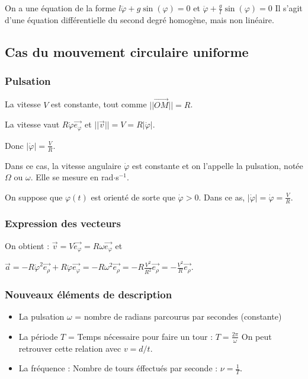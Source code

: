 \documentclass[french]{yLectureNote}
\renewcommand{\vec}{\overrightarrow}
\newcommand{\norm}[1]{||\vec{#1}||}
\begin{document}
On a une équation de la forme $l\ddot{\varphi} + g\sin(\varphi) = 0$ et $\ddot{\varphi} + \frac{g}{l}\sin(\varphi) = 0$ Il s'agit d'une équation différentielle du second degré homogène, mais non linéaire.

\subsection{Cas du mouvement circulaire uniforme}
\subsubsection{Pulsation}
La vitesse $V$ est constante, tout comme $\norm{OM} = R$.

 La vitesse vaut $R\dot{\varphi}\vec{e_{\varphi}}$ et $\norm{v} = V = R|\dot{\varphi}|$.

 Donc $|\dot{\varphi}| = \frac{V}{R}$.

Dans ce cas, la vitesse angulaire $\dot{\varphi}$ est constante et on l'appelle la pulsation, notée $\Omega$ ou $\omega$. Elle se mesure en rad$\cdot$s$^{-1}$.

On suppose que $\varphi(t)$ est orienté de sorte que $\dot{\varphi} >0$. Dans ce as, $|\dot{\varphi}| = \dot{\varphi} = \frac{V}{R}$.
\subsubsection{Expression des vecteurs}

On obtient :
$\vec{v} = V\vec{e_{\varphi}} = R\omega \vec{e_{\varphi}}$ et

$\vec{a} = -R\dot{\varphi}^2\vec{e_{\rho}} + R\ddot{\varphi}\vec{e_{\varphi}} = -R\omega^2\vec{e_{\rho}} = -R\frac{V^2}{R^2}\vec{e_{\rho}} = -\frac{V^2}{R}\vec{e_{\rho}}$.


\subsubsection{Nouveaux éléments de description}
\begin{itemize}
 \item La pulsation $\omega$ = nombre de radians parcourus par secondes (constante)
 \item La période $T$ = Temps  nécessaire pour faire un tour : $T = \frac{2\pi}{\omega}$ On peut retrouver cette relation avec $v=d/t$.
 \item La fréquence : Nombre de tours éffectués par seconde : $\nu = \frac{1}{T}$.
\end{itemize}
\end{document}
